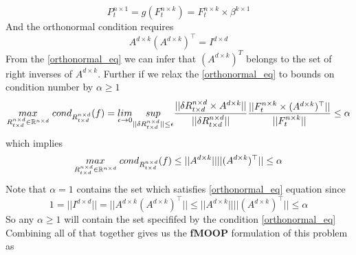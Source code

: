 \begin{equation} \label{g_for_lfm}
P^{n \times 1}_{t} = g(F^{n\times k}_t) = F^{n\times k}_t \times \beta^{k \times 1}
\end{equation}
\newline
And the orthonormal condition requires
\begin{equation} \label{orthonormal_eq}
 A^{d\times k}(A^{d\times k})^{\top} = I^{d\times d}
\end{equation}
\newline
From the \ref{orthonormal_eq} we can infer that $(A^{d\times k})^T$ belongs to the set of right inverses of $A^{d\times k}$. \newline Further if we relax the \ref{orthonormal_eq} to bounds on condition number by $\alpha \ge 1$
\begin{equation}
    \underset{R^{n\times d}_{t\times d} \in \mathbb{R}^{n\times d}}{max}\hspace{1mm} cond_{R^{n\times d}_{t\times d}}(f) = \underset{\epsilon \to 0}{lim}\underset{||\delta R^{n\times d}_{t\times d}||\le \epsilon}{sup} \frac{||\delta R^{n\times d}_{t\times d}\times A^{d\times k}||}{||\delta R^{n\times d}_{t\times d}||}  \frac{||F^{n\times k}_t \times (A^{d\times k})^{\top} ||}{|| F^{n\times k}_t||}\le \alpha
\end{equation}
which implies\newline
\begin{equation}
    \underset{R^{n\times d}_{t\times d} \in \mathbb{R}^{n\times d}}{max}\hspace{1mm} cond_{R^{n\times d}_{t\times d}}(f) \le ||A^{d\times k}|| ||(A^{d\times k})^{\top} ||\le \alpha
\end{equation}
\newline
Note that $\alpha=1$ contains the set which satisfies \ref{orthonormal_eq} equation since 
\begin{equation}
1= || I^{d\times d}||= || A^{d\times k}(A^{d\times k})^{\top} ||  \le || A^{d\times k}||||(A^{d\times k})^{\top} || \le \alpha
\end{equation}\newline
So any $\alpha \ge 1$ will contain the set specififed by the condition \ref{orthonormal_eq}\newline
Combining all of that together gives us the \textbf{fMOOP} formulation of this problem as


